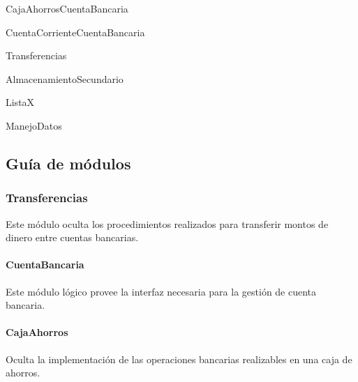 \documentclass[12pt,a4paper,fleqn]{article}
\begin{document}
\begin{hmodule}{CajaAhorros}{CuentaBancaria}
\end{hmodule}

\begin{hmodule}{CuentaCorriente}{CuentaBancaria}
\end{hmodule}

\begin{module}{Transferencias}
\eproc
{}
\end{module}

\begin{module}{AlmacenamientoSecundario}
\end{module}

\begin{gmodule}{Lista}{X}
\eproc
{}
\end{gmodule}


\begin{module}{ManejoDatos}
\eproc
{}
\end{module}

\subsection{Guía de módulos}

\subsubsection{Transferencias}
Este módulo oculta los procedimientos realizados para transferir montos de dinero
entre cuentas bancarias.
\paragraph{CuentaBancaria}
Este módulo lógico provee la interfaz necesaria para la gestión de cuenta bancaria.
\paragraph{CajaAhorros}
Oculta la implementación de las operaciones bancarias realizables en una caja de ahorros.
\end{document}
